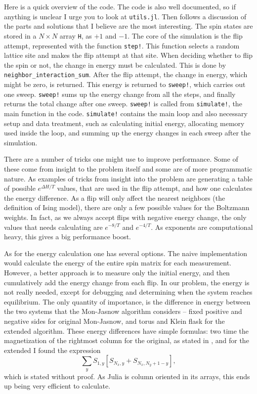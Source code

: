 \documentclass[12pt, a4paper]{article}
\begin{document}
Here is a quick overview of the code.
The code is also well documented, so if anything is unclear I urge you to look at \verb|utils.jl|.
Then follows a discussion of the parts and solutions that I believe are the most interesting.
The spin states are stored in a $N \times N$ array \verb|H|, as $+1$ and $-1$.
The core of the simulation is the flip attempt, represented with the function \verb|step!|.
This function selects a random lattice site and makes the flip attempt at that site.
When deciding whether to flip the spin or not, the change in energy must be calculated.
This is done by \verb|neighbor_interaction_sum|.
After the flip attempt, the change in energy, which might be zero, is returned.
This energy is returned to \verb|sweep!|, which carries out one sweep.
\verb|sweep!| sums up the energy change from all the steps, and finally returns the total change after one sweep.
\verb|sweep!| is called from \verb|simulate!|, the main function in the code.
\verb|simulate!| contains the main loop and also necessary setup and data treatment, such as calculating initial energy, allocating memory used inside the loop, and summing up the energy changes in each sweep after the simulation.


There are a number of tricks one might use to improve performance.
Some of these come from insight to the problem itself and some are of more programmatic nature.
As examples of tricks from insight into the problem are generating a table of possible $e^{\Delta H/T}$ values, that are used in the flip attempt, and how one calculates the energy difference.
As a flip will only affect the nearest neighbors (the definition of Ising model), there are only a few possible values for the Boltzmann weights.
In fact, as we always accept flips with negative energy change, the only values that needs calculating are $e^{-8/T}$ and $e^{-4/T}$.
As exponents are computational heavy, this gives a big performance boost.


As for the energy calculation one has several options.
The naive implementation would calculate the energy of the entire spin matrix for each measurement.
However, a better approach is to measure only the initial energy, and then cumulatively add the energy change from each flip.
In our problem, the energy is not really needed, except for debugging and determining when the system reaches equilibrium.
The only quantity of importance, is the difference in energy between the two systems that the Mon-Jasnow algorithm considers -- fixed positive and negative sides for original Mon-Jasnow, and torus and Klein flask for the extended algorithm.
These energy differences have simple formulas: two time the magnetization of the rightmost column for the original, as stated in \cite{mon_jasnow}, and for the extended I found the expression
\begin{equation}
  \sum_y S_{1,y} [ S_{N_x, y} + S_{N_x, N_y+1-y} ],
\end{equation}
which is stated without proof.
As Julia is column oriented in its arrays, this ends up being very efficient to calculate.
\end{document}
